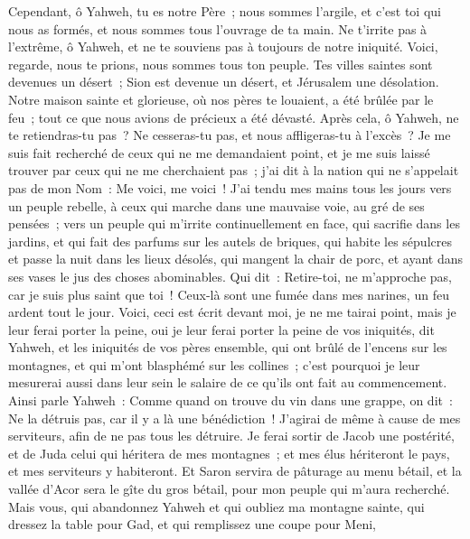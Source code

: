 \begin{multicols}{2}
Cependant, ô Yahweh, tu es notre Père~; nous sommes l'argile, et c'est toi qui nous as formés, et nous sommes tous l'ouvrage de ta main.
Ne t'irrite pas à l'extrême, ô Yahweh, et ne te souviens pas à toujours de notre iniquité. Voici, regarde, nous te prions, nous sommes tous ton peuple.
Tes villes saintes sont devenues un désert~; Sion est devenue un désert, et Jérusalem une désolation.
Notre maison sainte et glorieuse, où nos pères te louaient, a été brûlée par le feu~; tout ce que nous avions de précieux a été dévasté.
Après cela, ô Yahweh, ne te retiendras-tu pas~? Ne cesseras-tu pas, et nous affligeras-tu à l'excès~?
\VerseOne{}Je me suis fait recherché de ceux qui ne me demandaient point, et je me suis laissé trouver par ceux qui ne me cherchaient pas~; j'ai dit à la nation qui ne s'appelait pas de mon Nom~: Me voici, me voici~!
J'ai tendu mes mains tous les jours vers un peuple rebelle, à ceux qui marche dans une mauvaise voie, au gré de ses pensées~;
vers un peuple qui m'irrite continuellement en face, qui sacrifie dans les jardins, et qui fait des parfums sur les autels de briques,
qui habite les sépulcres et passe la nuit dans les lieux désolés, qui mangent la chair de porc, et ayant dans ses vases le jus des choses abominables.
Qui dit~: Retire-toi, ne m'approche pas, car je suis plus saint que toi~! Ceux-là sont une fumée dans mes narines, un feu ardent tout le jour.
Voici, ceci est écrit devant moi, je ne me tairai point, mais je leur ferai porter la peine, oui je leur ferai porter la peine
de vos iniquités, dit Yahweh, et les iniquités de vos pères ensemble, qui ont brûlé de l'encens sur les montagnes, et qui m'ont blasphémé sur les collines~; c'est pourquoi je leur mesurerai aussi dans leur sein le salaire de ce qu'ils ont fait au commencement.
Ainsi parle Yahweh~: Comme quand on trouve du vin dans une grappe, on dit~: Ne la détruis pas, car il y a là une bénédiction~! J'agirai de même à cause de mes serviteurs, afin de ne pas tous les détruire.
Je ferai sortir de Jacob une postérité, et de Juda celui qui héritera de mes montagnes~; et mes élus hériteront le pays, et mes serviteurs y habiteront.
Et Saron servira de pâturage au menu bétail, et la vallée d'Acor sera le gîte du gros bétail, pour mon peuple qui m'aura recherché.
Mais vous, qui abandonnez Yahweh et qui oubliez ma montagne sainte, qui dressez la table pour Gad, et qui remplissez une coupe pour Meni,

\end{multicols}
